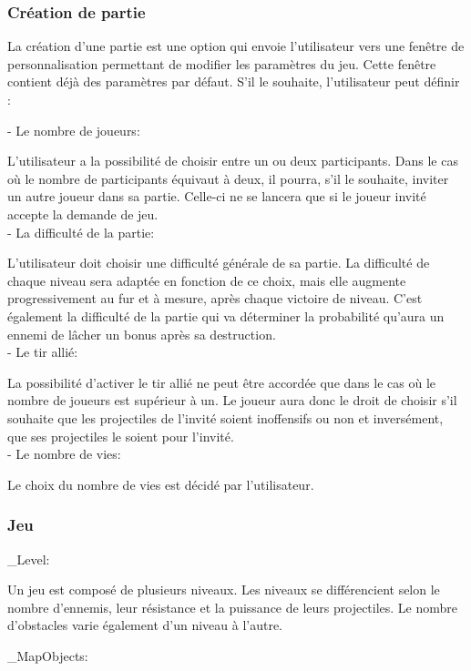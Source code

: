 \documentclass[a4paper,12pt]{article}
\begin{document}
\subsubsection{Création de partie}
La création d'une partie est une option qui envoie l'utilisateur vers une fenêtre de personnalisation permettant de modifier les paramètres du jeu.
Cette fenêtre contient déjà des paramètres par défaut.
S'il le souhaite, l'utilisateur peut définir :

- Le nombre de joueurs: 

L'utilisateur a la possibilité de choisir entre un ou deux participants. Dans le cas où le nombre de participants équivaut à deux, il pourra, s'il le souhaite, inviter un autre joueur dans sa partie. Celle-ci ne se lancera que si le joueur invité accepte la demande de jeu. \\

- La difficulté de la partie:

 L'utilisateur doit choisir une difficulté générale de sa partie. La difficulté de chaque niveau sera adaptée en fonction de ce choix, mais elle augmente progressivement au fur et à mesure, après chaque victoire de niveau. C'est également la difficulté de la partie qui va déterminer la probabilité qu'aura un ennemi de lâcher un bonus après sa destruction. \\

- Le tir allié: 

La possibilité d'activer le tir allié ne peut être accordée que dans le cas où le nombre de joueurs est supérieur à un.
Le joueur aura donc le droit de choisir s'il souhaite que les projectiles de l'invité soient inoffensifs ou non et inversément, que ses projectiles le soient pour l'invité. \\

- Le nombre de vies: 

Le choix du nombre de vies est décidé par l'utilisateur. \\

\subsubsection{Jeu}

\_Level:

Un jeu est composé de plusieurs niveaux. Les niveaux se différencient selon le nombre d'ennemis, leur résistance et la puissance de leurs projectiles. Le nombre d'obstacles varie également d'un niveau à l'autre.

\_MapObjects: 
\end{document}
